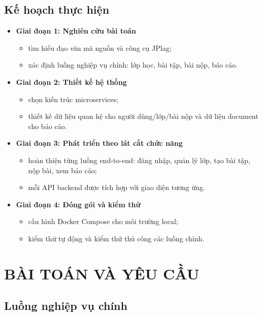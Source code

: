 \documentclass[12pt,a4paper]{article}
\begin{document}
\subsection{Kế hoạch thực hiện}

\begin{itemize}
    \item \textbf{Giai đoạn 1: Nghiên cứu bài toán}
    \begin{itemize}
        \item tìm hiểu đạo văn mã nguồn và công cụ JPlag;
        \item xác định luồng nghiệp vụ chính: lớp học, bài tập, bài nộp, báo cáo.
    \end{itemize}
    \item \textbf{Giai đoạn 2: Thiết kế hệ thống}
    \begin{itemize}
        \item chọn kiến trúc microservices;
        \item thiết kế dữ liệu quan hệ cho người dùng/lớp/bài nộp và dữ liệu document cho báo cáo.
    \end{itemize}
    \item \textbf{Giai đoạn 3: Phát triển theo lát cắt chức năng}
    \begin{itemize}
        \item hoàn thiện từng luồng end-to-end: đăng nhập, quản lý lớp, tạo bài tập, nộp bài, xem báo cáo;
        \item mỗi API backend được tích hợp với giao diện tương ứng.
    \end{itemize}
    \item \textbf{Giai đoạn 4: Đóng gói và kiểm thử}
    \begin{itemize}
        \item cấu hình Docker Compose cho môi trường local;
        \item kiểm thử tự động và kiểm thử thủ công các luồng chính.
    \end{itemize}
\end{itemize}

\section{BÀI TOÁN VÀ YÊU CẦU}

\subsection{Luồng nghiệp vụ chính}
\end{document}
